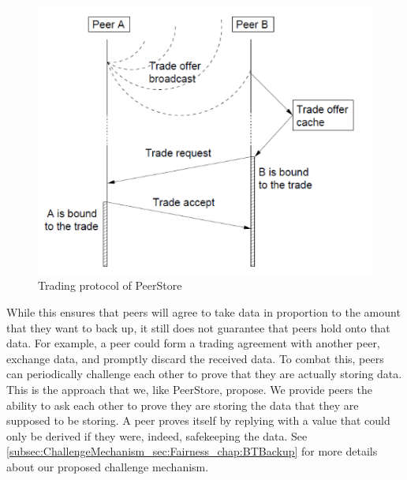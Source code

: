 \documentclass[12pt]{report}
\begin{document}
\begin{figure}
  \centering
  \includegraphics[scale=0.75]{PeerStoreTrading}
  \caption{Trading protocol of PeerStore \cite{PeerStore}}
  \label{fig:peerStoreTrading}
\end{figure}

While this ensures that peers will agree to take data in proportion to the amount that they want to back up, it still does not guarantee that peers hold onto that data. For example, a peer could form a trading agreement with another peer, exchange data, and promptly discard the received data. To combat this, peers can periodically challenge each other to prove that they are actually storing data. This is the approach that we, like PeerStore, propose. We provide peers the ability to ask each other to prove they are storing the data that they are supposed to be storing. A peer proves itself by replying with a value that could only be derived if they were, indeed, safekeeping the data. See \ref{subsec:ChallengeMechanism_sec:Fairness_chap:BTBackup}
 for more details about our proposed challenge mechanism.
\end{document}
